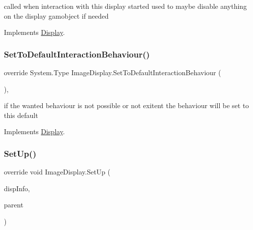 called when interaction with this display started used to maybe disable anything on the display gamobject if needed 



Implements \mbox{\hyperlink{class_display_a21c51fcf185403197a78a5acfd2065de}{Display}}.

\mbox{\label{class_image_display_ae975595939d76dd1db32e6f029f53ab6}} 
\subsubsection{\texorpdfstring{Set\+To\+Default\+Interaction\+Behaviour()}{SetToDefaultInteractionBehaviour()}}
{\footnotesize\ttfamily override System.\+Type Image\+Display.\+Set\+To\+Default\+Interaction\+Behaviour (\begin{DoxyParamCaption}{ }\end{DoxyParamCaption})\hspace{0.3cm}{\ttfamily [protected]}, {\ttfamily [virtual]}}



if the wanted behaviour is not possible or not exitent the behaviour will be set to this default 



Implements \mbox{\hyperlink{class_display_a81f07350cf50b3924f4fe269e1b4cf17}{Display}}.

\mbox{\label{class_image_display_a28fead7caeeb12490d26fae943da6a1e}} 
\subsubsection{\texorpdfstring{Set\+Up()}{SetUp()}}
{\footnotesize\ttfamily override void Image\+Display.\+Set\+Up (\begin{DoxyParamCaption}\item[{\mbox{\hyperlink{class_museum_display_info}{Museum\+Display\+Info}}}]{disp\+Info,  }\item[{Game\+Object}]{parent }\end{DoxyParamCaption})\hspace{0.3cm}{\ttfamily [virtual]}}



